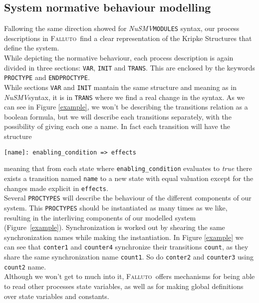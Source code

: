 \documentclass[12pt]{llncs2e/llncs}
\newcommand{\nusmv}{\mbox{\textit{NuSMV}}}
\newcommand{\fallutoSp}{\mbox{\textsc{Falluto~}}}
\begin{document}
\subsection{System normative behaviour modelling}
Fallowing the same direction showed for \nusmv \texttt{MODULES} syntax, our process descriptions in \fallutoSp find a clear representation of the Kripke Structures that define the system.\\
While depicting the normative behaviour, each process description is again divided in three sections: \texttt{VAR}, \texttt{INIT} and \texttt{TRANS}. This are enclosed by the keywords \texttt{PROCTYPE} and \texttt{ENDPROCTYPE}.\\
While sections \texttt{VAR} and \texttt{INIT} mantain the same structure and meaning as in \nusmv syntax, it is in \texttt{TRANS} where we find a real change in the syntax. As we can see in Figure \ref{example}, we won't be describing the transitions relation as a boolean formula, but we will describe each transitions separately, with the possibility of giving each one a name. In fact each transition will have the structure
\begin{center}
\texttt{[name]: enabling\_condition => effects}
\end{center}
meaning that from each state where \texttt{enabling\_condition} evaluates to \textit{true} there exists a transition named \texttt{name} to a new state with equal valuation except for the changes made explicit in \texttt{effects}.\\
Several \texttt{PROCTYPES} will describe the behaviour of the different components of our system. This \texttt{PROCTYPES} should be instantiated as many times as we like, resulting in the interliving components of our modelled system (\mbox{Figure \ref{example}}).
Synchronization is worked out by shearing the same synchronization names while making the instantiation. In Figure \ref{example} we can see that \texttt{conter1} and \texttt{counter4} synchronize their transitions \texttt{count}, as they share the same synchronization name \texttt{count1}. So do \texttt{conter2} and \texttt{counter3} using \texttt{count2} name.\\
Although we won't get to much into it, \fallutoSp offers mechanisms for being able to read other processes state variables, as well as for making global definitions over state variables and constants.
\end{document}
